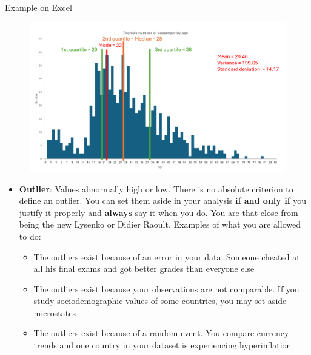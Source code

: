 \documentclass[compress]{beamer}
\begin{document}
\begin{frame}
	Example on Excel
\end{frame}

\begin{frame}
	\begin{figure}
		\centering
		\includegraphics[scale=0.5]{Picture/Exemple titanic quartile.PNG}
	\end{figure}
\end{frame}

\begin{frame}
	\begin{itemize}
		\item \textbf{Outlier}: Values abnormally high or low. There is no absolute criterion to define an outlier. You can set them aside in your analysis \textbf{if and only if} you justify it properly and \textbf{always} say it when you do. You are that close from being the new Lysenko or Didier Raoult. Examples of what you are allowed to do:
		\vspace{0.2cm}
		\begin{itemize}
			\item The outliers exist because of an error in your data. Someone cheated at all his final exams and got better grades than everyone else
			\vspace{0.2cm}
			\item The outliers exist because your observations are not comparable. If you study sociodemographic values of some countries, you may set aside microstates
			\vspace{0.2cm}
			\item The outliers exist because of a random event. You compare currency trends and one country in your dataset is experiencing hyperinflation
		\end{itemize}
	\end{itemize}
\end{frame}
\end{document}
